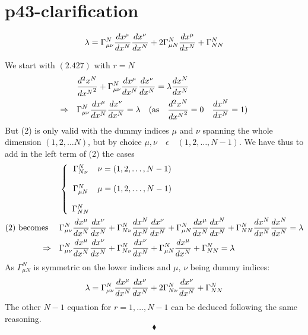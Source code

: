 \section{p43-clarification }
\begin{tcolorbox}
$$\lambda = \Gamma^N_{\mu \nu}\dv{x^{\mu}}{x^N} \dv{x^{\nu}}{x^N} + 2\Gamma^N_{\mu N}\dv{x^{\mu}}{x^N}+\Gamma^N_{N N} $$
\end{tcolorbox}
We start with $\mathbf{(2.427)}$ with $r=N$
\begin{align}
\ &\dv[2]{x^N}{{x^{N}}} + \Gamma^N_{\mu\nu}\dv{x^{\mu}}{x^N} \dv{x^{\nu}}{x^N} = \lambda \dv{x^N}{x^N}\\
\Rightarrow\quad &\Gamma^N_{\mu\nu}\dv{x^{\mu}}{x^N} \dv{x^{\nu}}{x^N} = \lambda \quad \text{(as}\quad \dv[2]{x^N}{{x^{N}}} = 0 \quad \dv{x^N}{x^N} = 1 \text{)}
\end{align}
But (2) is only valid with the dummy indices $\mu$ and $\nu$ spanning the whole dimension $(1,2,\dots N)$, but by choice $\mu,\nu \quad \epsilon \quad (1,2, \dots, N-1)$. We have thus to add in the left term of (2) the cases
\begin{align*}
&\left\{ \begin{array}{cc}
\Gamma^N_{N\nu}& \nu = (1,2,\dots ,N-1)\\\\
\Gamma^N_{\mu N}& \mu = (1,2,\dots ,N-1)\\\\
\Gamma^N_{NN}& \\
\end{array} \right.\\
\text{(2) becomes } \quad &\Gamma^N_{\mu\nu}\dv{x^{\mu}}{x^N} \dv{x^{\nu}}{x^N} + \Gamma^N_{N \nu}\dv{x^N}{x^N} \dv{x^{\nu}}{x^N} + \Gamma^N_{\mu N}\dv{x^{\mu}}{x^N} \dv{x^{N}}{x^N} + \Gamma^N_{NN}\dv{x^{N}}{x^N} \dv{x^{N}}{x^N}= \lambda\\
\Rightarrow   \quad &\Gamma^N_{\mu\nu}\dv{x^{\mu}}{x^N} \dv{x^{\nu}}{x^N} + \Gamma^N_{N \nu}\dv{x^{\nu}}{x^N} + \Gamma^N_{\mu N}\dv{x^{\mu}}{x^N}+ \Gamma^N_{NN} = \lambda
\end{align*}
As $\Gamma^N_{\mu N}$ is symmetric on the lower indices and $\mu$, $\nu$ being dummy indices:
\begin{align*}
\lambda  =\Gamma^N_{\mu\nu}\dv{x^{\mu}}{x^N} \dv{x^{\nu}}{x^N} + 2\Gamma^N_{N \nu}\dv{x^{\nu}}{x^N} +\Gamma^N_{NN}
\end{align*}
The other $N-1$ equation for $r= 1,\dots, N-1$ can be deduced following the same reasoning.
$$\blacklozenge$$
\newpage


